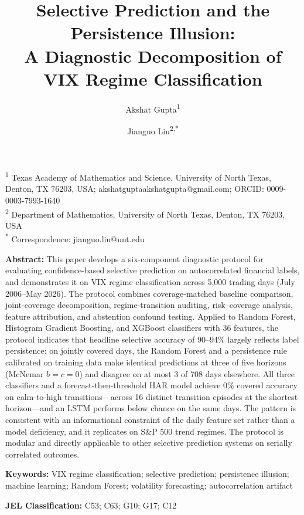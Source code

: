 \documentclass[12pt]{article}
\title{\textbf{Selective Prediction and the Persistence Illusion:\\
A Diagnostic Decomposition of VIX Regime Classification}}
\author{
    Akshat Gupta\textsuperscript{1} \and
    Jianguo Liu\textsuperscript{2,*}
}
\date{}
\begin{document}
\maketitle

\noindent\textsuperscript{1} Texas Academy of Mathematics and Science, University of North Texas,
Denton, TX 76203, USA; akshatguptaakshatgupta@gmail.com; ORCID: 0009-0003-7993-1640\\
\textsuperscript{2} Department of Mathematics, University of North Texas, Denton, TX 76203, USA\\
\textsuperscript{*} Correspondence: jianguo.liu@unt.edu

\vspace{1em}
\noindent\textbf{Abstract:}
This paper develops a six-component diagnostic protocol for evaluating confidence-based
selective prediction on autocorrelated financial labels, and demonstrates it on VIX regime
classification across 5,000 trading days (July 2006--May 2026). The protocol combines
coverage-matched baseline comparison, joint-coverage decomposition, regime-transition
auditing, risk--coverage analysis, feature attribution, and abstention confound testing. Applied
to Random Forest, Histogram Gradient Boosting, and XGBoost classifiers with 36 features, the
protocol indicates that headline selective accuracy of 90--94\% largely reflects label
persistence: on jointly covered days, the Random Forest and a persistence rule calibrated on
training data make identical predictions at three of five horizons (McNemar $b = c = 0$) and
disagree on at most 3 of 708 days elsewhere. All three classifiers and a
forecast-then-threshold HAR model achieve 0\% covered accuracy on calm-to-high
transitions---across 16 distinct transition episodes at the shortest horizon---and an LSTM
performs below chance on the same days. The pattern is
consistent with an informational constraint of the daily feature set rather than a model
deficiency, and it replicates on S\&P 500 trend regimes. The protocol is modular and directly
applicable to other selective prediction systems on serially correlated outcomes.

\vspace{0.5em}
\noindent\textbf{Keywords:} VIX regime classification; selective prediction; persistence illusion;
machine learning; Random Forest; volatility forecasting; autocorrelation artifact

\vspace{0.5em}
\noindent\textbf{JEL Classification:} C53; C63; G10; G17; C12
\end{document}
